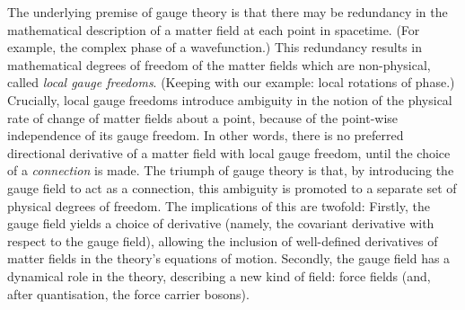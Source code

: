 The underlying premise of gauge theory is that there may be redundancy in the mathematical description of a matter field at each point in spacetime.
(For example, the complex phase of a wavefunction.)
This redundancy results in mathematical degrees of freedom of the matter fields which are non-physical, called \emph{local gauge freedoms}.
(Keeping with our example: local rotations of phase.)
Crucially, local gauge freedoms introduce ambiguity in the notion of the physical rate of change of matter fields about a point, because of the point-wise independence of its gauge freedom.
In other words, there is no preferred directional derivative of a matter field with local gauge freedom, until the choice of a \emph{connection} is made.
The triumph of gauge theory is that, by introducing the gauge field to act as a connection, this ambiguity is promoted to a separate set of physical degrees of freedom.
The implications of this are twofold:
Firstly, the gauge field yields a choice of derivative (namely, the covariant derivative with respect to the gauge field), allowing the inclusion of well-defined derivatives of matter fields in the theory's equations of motion.
Secondly, the gauge field has a dynamical role in the theory, describing a new kind of field: force fields (and, after quantisation, the force carrier bosons).



